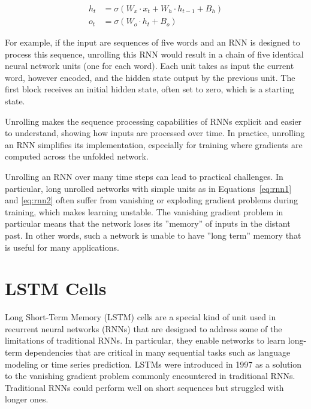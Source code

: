 \begin{align}
h_t &= \sigma ( W_{x} \cdot x_t + W_{h} \cdot h_{t-1} + B_{h}) \label{eq:rnn1} \\
o_t &= \sigma (W_{o} \cdot h_t + B_{o} ) \label{eq:rnn2} 
\end{align}

For example, if the input are sequences of five words and an RNN is designed to process this sequence, unrolling this RNN would result in a chain of five identical neural network units (one for each word). Each unit takes as input the current word, however encoded, and the hidden state output by the previous unit. The first block receives an initial hidden state, often set to zero, which is a starting state.

Unrolling makes the sequence processing capabilities of RNNs explicit and easier to understand, showing how inputs are processed over time. In practice, unrolling an RNN simplifies its implementation, especially for training where gradients are computed across the unfolded network. 

Unrolling an RNN over many time steps can lead to practical challenges. In particular, long unrolled networks with simple units as in Equations~\ref{eq:rnn1} and \ref{eq:rnn2} often suffer from vanishing or exploding gradient problems during training, which makes learning unstable. The vanishing gradient problem in particular means that the network loses its ''memory'' of inputs in the distant past. In other words, such a network is unable to have ''long term'' memory that is useful for many applications.

\section{LSTM Cells}

Long Short-Term Memory (LSTM) cells are a special kind of unit used in recurrent neural networks (RNNs) that are designed to address some of the limitations of traditional RNNs. In particular, they enable networks to learn long-term dependencies that are critical in many sequential tasks such as language modeling or time series prediction. LSTMs were introduced in 1997 as a solution to the vanishing gradient problem commonly encountered in traditional RNNs. Traditional RNNs could perform well on short sequences but struggled with longer ones.

